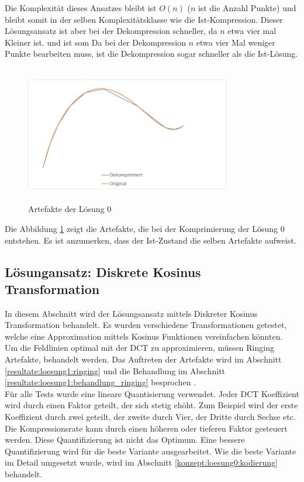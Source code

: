 Die Komplexität dieses Ansatzes bleibt ist $O(n)$ ($n$ ist die Anzahl Punkte) und bleibt somit in der selben Komplexitätsklasse wie die Ist-Kompression. Dieser Lösungsansatz ist aber bei der Dekompression schneller, da $n$ etwa vier mal Kleiner ist. und ist som  Da bei der Dekompression $n$ etwa vier Mal weniger Punkte bearbeiten muss, ist die Dekompression sogar schneller als die Ist-Lösung.\\
\begin{figure}[!htbp]
	\center
	\includegraphics[width=0.8\textwidth,height=6cm,keepaspectratio]{./pictures/resultate/loesung0/loesung0_artefakte.png}
	\caption{Artefakte der Lösung 0}
	\label{resultate:loesung0:artefakte}
\end{figure}
Die Abbildung \ref{resultate:loesung0:artefakte} zeigt die Artefakte, die bei der Komprimierung der Lösung 0 entstehen. Es ist anzumerken, dass der Ist-Zustand die selben Artefakte aufweist.
\pagebreak

\subsection{Lösungansatz: Diskrete Kosinus Transformation}
In diesem Abschnitt wird der Lösungsansatz mittels Diskreter Kosinus Transformation behandelt. Es wurden verschiedene Transformationen getestet, welche eine Approximation mittels Kosinus Funktionen vereinfachen könnten.\\
Um die Feldlinien optimal mit der DCT zu approximieren, müssen Ringing Artefakte, behandelt werden. Das Auftreten der Artefakte wird im Abschnitt \ref{resultate:loesung1:ringing} und die Behandlung im Abschnitt \ref{resultate:loesung1:behandlung_ringing} besprochen .\\
[\baselineskip]
Für alle Tests wurde eine lineare Quantisierung verwendet. Jeder DCT Koeffizient wird durch einen Faktor geteilt, der sich stetig ehöht. Zum Beispiel wird der erste Koeffizient durch zwei geteilt, der zweite durch Vier, der Dritte durch Sechse etc.  Die Kompressionsrate kann durch einen höheren oder tieferen Faktor gesteuert werden. Diese Quantifizierung ist nicht das Optimum. Eine bessere Quantifizierung wird für die beste Variante ausgearbeitet. Wie die beste Variante im Detail umgesetzt wurde, wird im Abschnitt \ref{konzept:loesung0:kodierung} behandelt. 

